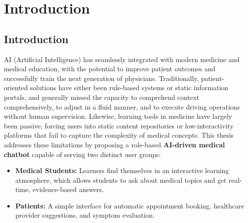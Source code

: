 \chapter{Introduction}

\label{Chapter1}
\section{Introduction}
AI (Artificial Intelligence) has seamlessly integrated with modern medicine and medical education, with the potential to improve patient outcomes and successfully train the next generation of physicians. Traditionally, patient-oriented solutions have either been rule-based systems or static information portals, and generally missed the capacity to comprehend context comprehensively, to adjust in a ﬂuid manner, and to execute driving operations without human supervision. Likewise, learning tools in medicine have largely been passive, forcing users into static content repositories or low-interactivity platforms that fail to capture the complexity of medical concepts.
\noindent This thesis addresses these limitations by proposing a role-based \textbf{AI-driven medical chatbot} capable of serving two distinct user groups:
\begin{itemize}
    \item \textbf{Medical Students:} Learners find themselves in an interactive learning atmosphere, which allows students to ask about medical topics and get real-time, evidence-based answers.
    \item \textbf{Patients:} A simple interface for automatic appointment booking, healthcare provider suggestions, and symptom evaluation.
\end{itemize}




